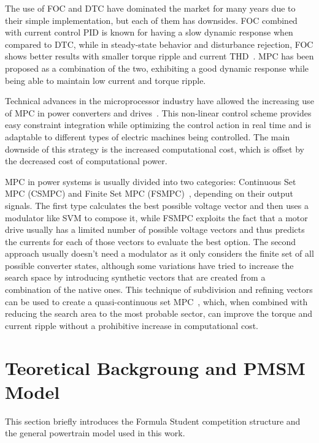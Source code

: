 \documentclass[9pt,conference]{IEEEtran}
\begin{document}
The use of FOC and DTC have dominated the market for many years due to their simple implementation, but each of them has downsides\@. FOC combined with current control PID is known for having a slow dynamic response when compared to DTC, while in steady-state behavior and disturbance rejection, FOC shows better results with smaller torque ripple and current THD~\cite{Merzoug:FOCvsDTC:2008,Korkmaz:FOCvsDTC:2013,Souad:FOCvsDTC:2008}. MPC has been proposed as a combination of the two, exhibiting a good dynamic response while being able to maintain low current and torque ripple. 

Technical advances in the microprocessor industry have allowed the increasing use of MPC in power converters and drives~\cite{Vazquez:MPC_in_power_systems_review:2017:IEEE}. This non-linear control scheme provides easy constraint integration while optimizing the control action in real time and is adaptable to different types of electric machines being controlled. The main downside of this strategy is the increased computational cost, which is offset by the decreased cost of computational power.

MPC in power systems is usually divided into two categories: Continuous Set MPC (CSMPC) and Finite Set MPC (FSMPC)~\cite{Wang:MPC_in_Electrical_Machines_review:2017:IEEE}, depending on their output signals. The first type calculates the best possible voltage vector and then uses a modulator like SVM to compose it, while FSMPC exploits the fact that a motor drive usually has a limited number of possible voltage vectors and thus predicts the currents for each of those vectors to evaluate the best option. The second approach usually doesn't need a modulator as it only considers the finite set of all possible converter states, although some variations have tried to increase the search space by introducing synthetic vectors that are created from a combination of the native ones. This technique of subdivision and refining vectors can be used to create a quasi-continuous set MPC~\cite{Ma:MPC_Syntetic_vector:2014:IEEE}, which, when combined with reducing the search area to the most probable sector, can improve the torque and current ripple without a prohibitive increase in computational cost.

\section{Teoretical Backgroung and PMSM Model}
This section briefly introduces the Formula Student competition structure and the general powertrain model used in this work.
\end{document}
